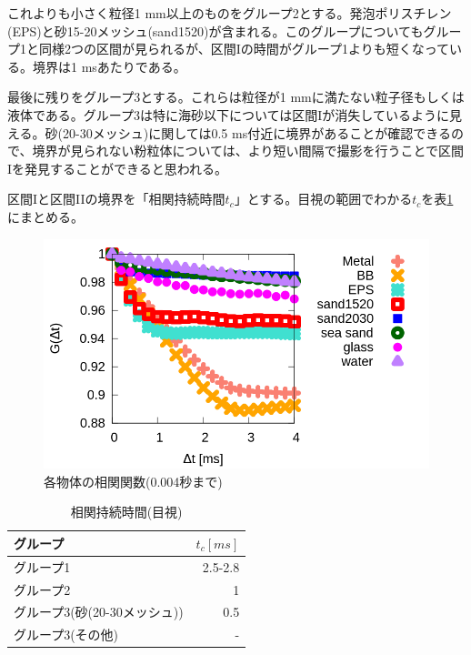 \documentclass[a4paper,10pt,twocolumn,dvipdfmx]{jsarticle}
\newcommand{\II}{I\hspace{-.1em}I}
\begin{document}
これよりも小さく粒径1 mm以上のものをグループ2とする。発泡ポリスチレン(EPS)と砂15-20メッシュ(sand1520)が含まれる。このグループについてもグループ1と同様2つの区間が見られるが、区間Iの時間がグループ1よりも短くなっている。境界は1 msあたりである。 \par
最後に残りをグループ3とする。これらは粒径が1 mmに満たない粒子径もしくは液体である。グループ3は特に海砂以下については区間Iが消失しているように見える。砂(20-30メッシュ)に関しては0.5 ms付近に境界があることが確認できるので、境界が見られない粉粒体については、より短い間隔で撮影を行うことで区間Iを発見することができると思われる。\par
区間Iと区間\II の境界を「相関持続時間$t_c$」とする。目視の範囲でわかる$t_c$を表\ref{tb:tc_eye}にまとめる。
\begin{figure}[H]
	\includegraphics[scale=0.4]{init.png}
	\caption{各物体の相関関数(0.004秒まで)}
	\label{fig:init}
\end{figure}

\begin{table}[H]
	\caption{相関持続時間(目視) \label{tb:tc_eye}}
	\begin{tabular}{lr}
		\toprule
		グループ & $t_c [ms]$ \\
		\midrule
		グループ1 & 2.5-2.8 \\
		グループ2 & 1 \\
		グループ3(砂(20-30メッシュ)) & 0.5 \\
		グループ3(その他) & - \\
		\bottomrule
	\end{tabular}
\end{table}
\end{document}
